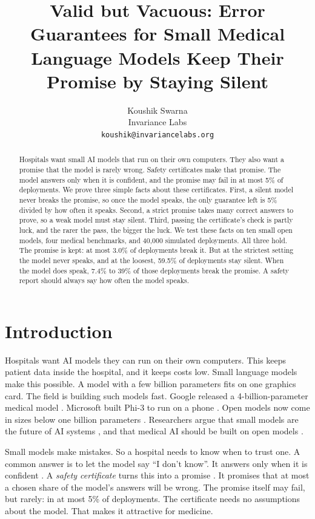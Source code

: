 \documentclass[11pt]{article}
\title{\textbf{Valid but Vacuous: Error Guarantees for Small Medical Language Models Keep Their Promise by Staying Silent}}
\author{Koushik Swarna \\ Invariance Labs \\ \texttt{koushik@invariancelabs.org}}
\date{}
\theoremstyle{plain}
\theoremstyle{definition}
\begin{document}
\maketitle

\begin{abstract}
Hospitals want small AI models that run on their own computers. They also want a promise that the model is rarely wrong. Safety certificates make that promise. The model answers only when it is confident, and the promise may fail in at most 5\% of deployments. We prove three simple facts about these certificates. First, a silent model never breaks the promise, so once the model speaks, the only guarantee left is 5\% divided by how often it speaks. Second, a strict promise takes many correct answers to prove, so a weak model must stay silent. Third, passing the certificate's check is partly luck, and the rarer the pass, the bigger the luck. We test these facts on ten small open models, four medical benchmarks, and 40{,}000 simulated deployments. All three hold. The promise is kept: at most 3.0\% of deployments break it. But at the strictest setting the model never speaks, and at the loosest, 59.5\% of deployments stay silent. When the model does speak, 7.4\% to 39\% of those deployments break the promise. A safety report should always say how often the model speaks.
\end{abstract}

\section{Introduction}

Hospitals want AI models they can run on their own computers. This keeps patient data inside the hospital, and it keeps costs low. Small language models make this possible. A model with a few billion parameters fits on one graphics card. The field is building such models fast. Google released a 4-billion-parameter medical model \citep{sellergren2025medgemma}. Microsoft built Phi-3 to run on a phone \citep{abdin2024phi3}. Open models now come in sizes below one billion parameters \citep{qwen2024qwen25,allal2025smollm2,gemma2025gemma3}. Researchers argue that small models are the future of AI systems \citep{belcak2025slm}, and that medical AI should be built on open models \citep{riedemann2024open}.

Small models make mistakes. So a hospital needs to know when to trust one. A common answer is to let the model say ``I don't know''. It answers only when it is confident \citep{el2010foundations,geifman2017selective}. A \emph{safety certificate} turns this into a promise \citep{bates2021distribution,angelopoulos2022ltt}. It promises that at most a chosen share of the model's answers will be wrong. The promise itself may fail, but rarely: in at most 5\% of deployments. The certificate needs no assumptions about the model. That makes it attractive for medicine.
\end{document}
